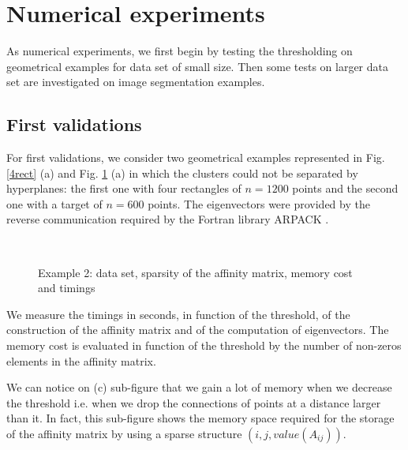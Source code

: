 \documentclass{llncs}
\begin{document}
\section{Numerical experiments}

As numerical experiments, we first begin by testing the thresholding on geometrical examples for  data set of small size. 
Then some tests on larger data set are investigated on image segmentation examples.


\subsection{First validations}
For first validations, we consider two geometrical examples represented in Fig.
\ref{4rect} (a) and Fig. \ref{cible} (a) in which the clusters could not be
separated by hyperplanes: the first one with four rectangles of $n=1200$ points 
and the second one with a target of $n=600$ points.
The eigenvectors were provided by the reverse communication required by the
Fortran library ARPACK \cite{lehoucq1998arpack}.

\begin{figure}[!h]
  \begin{center}
    \hspace{2cm}
    \\
    \hspace{2cm}
  \end{center}
  \caption{Example 2: data set, sparsity of the affinity matrix, memory cost and timings}
  \label{cible}
 \end{figure}


We measure the timings in seconds, in function of the threshold, of the
construction of the affinity matrix and of the computation of eigenvectors.
The memory cost is evaluated in function of the threshold by the number of
non-zeros elements in the affinity matrix.

We can notice on (c) sub-figure that we gain a lot of memory when we decrease
the threshold i.e.  when we drop the connections of points at a distance larger
than it. In fact, this sub-figure shows the memory space required for the storage of the affinity matrix by using a sparse structure $(i,j,value(A_{ij}))$.
\end{document}
